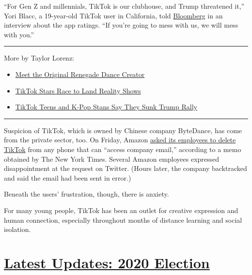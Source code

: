 ``For Gen Z and millennials, TikTok is our clubhouse, and Trump
threatened it,'' Yori Blacc, a 19-year-old TikTok user in California,
told
\href{https://www.bloomberg.com/news/articles/2020-07-09/tiktok-teens-try-to-trick-trump-campaign-again}{Bloomberg}
in an interview about the app ratings. ``If you're going to mess with
us, we will mess with you.''

\begin{center}\rule{0.5\linewidth}{\linethickness}\end{center}

More by Taylor Lorenz:

\begin{itemize}
\item
  \href{https://www.nytimes.com/2020/02/13/style/the-original-renegade.html}{Meet
  the Original Renegade Dance Creator}
\item
  \href{https://www.nytimes.com/2020/07/09/style/tiktok-stars-race-to-land-reality-shows.html}{TikTok
  Stars Race to Land Reality Shows}
\item
  \href{https://www.nytimes.com/2020/06/21/style/tiktok-trump-rally-tulsa.html}{TikTok
  Teens and K-Pop Stans Say They Sunk Trump Rally}
\end{itemize}

\begin{center}\rule{0.5\linewidth}{\linethickness}\end{center}

Suspicion of TikTok, which is owned by Chinese company ByteDance, has
come from the private sector, too. On Friday, Amazon
\href{https://www.nytimes.com/2020/07/10/technology/tiktok-amazon-security-risk.html}{asked
its employees to delete TikTok} from any phone that can ``access company
email,'' according to a memo obtained by The New York Times. Several
Amazon employees expressed disappointment at the request on Twitter.
(Hours later, the company backtracked and said the email had been sent
in error.)

Beneath the users' frustration, though, there is anxiety.

For many young people, TikTok has been an outlet for creative expression
and human connection, especially throughout months of distance learning
and social isolation.

\hypertarget{latest-updates-2020-election}{%
\section{\texorpdfstring{\href{https://www.nytimes.com/2020/08/03/us/elections/biden-vs-trump.html?action=click\&pgtype=Article\&state=default\&region=MAIN_CONTENT_1\&context=storylines_live_updates}{Latest
Updates: 2020
Election}}{Latest Updates: 2020 Election}}\label{latest-updates-2020-election}}

